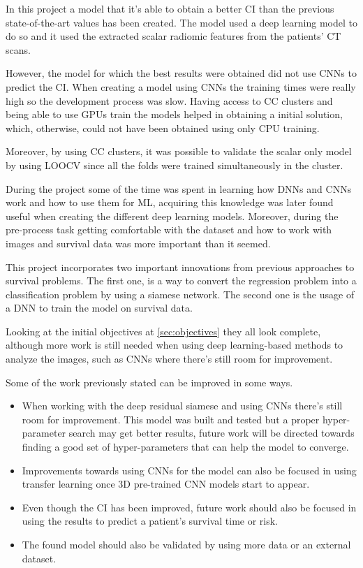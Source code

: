

In this project a model that it's able to obtain a better \gls{CI} than the previous 
state-of-the-art values has been created. The model used a deep learning model to do so
and it used the extracted scalar radiomic features from the patients' \gls{CT} scans.

However, the model for which the best results were obtained did not use \glspl{CNN} to 
predict the \gls{CI}. When creating a model using \glspl{CNN} the training times were
really high so the development process was slow. Having access to \gls{CC} clusters  
and being able to use \glspl{GPU} train the models helped in obtaining a initial solution,
which, otherwise, could not have been obtained using only \acrshort{CPU} training.

Moreover, by using \gls{CC} clusters, it was possible to validate the scalar only model 
by using \gls{LOOCV} since all the folds were trained simultaneously in the cluster.

During the project some of the time was spent in learning how \glspl{DNN} and \glspl{CNN} 
work and how to use them for \gls{ML}, acquiring this knowledge was later found useful
when creating the different deep learning models. Moreover, during the pre-process task 
getting comfortable with the dataset and how to work with images and survival data was more
important than it seemed.

This project incorporates two important innovations from previous approaches to survival
problems. The first one, is a way to convert the regression problem into a classification
problem by using a siamese network. The second one is the usage of a \gls{DNN} to train
the model on survival data.

Looking at the initial objectives at \autoref{sec:objectives} they all look complete,
although more work is still needed when using deep learning-based methods to analyze 
the images, such as \glspl{CNN} where there's still room for improvement.


Some of the work previously stated can be improved in some ways. 

\begin{itemize}
  \item When working with the deep residual siamese and using \glspl{CNN} there's still 
  room for improvement. This model was built and tested but a proper 
  hyper-parameter search may get better results, future work will be directed towards
  finding a good set of hyper-parameters that can help the model to converge.
  \item Improvements towards using \glspl{CNN} for the model can also be focused in 
  using transfer learning once 3D pre-trained \gls{CNN} models start to appear.
  \item Even though the \gls{CI} has been improved, future work should also be focused in 
  using the results to predict a patient's survival time or risk.
  \item The found model should also be validated by using more data or an external dataset.
\end{itemize}
